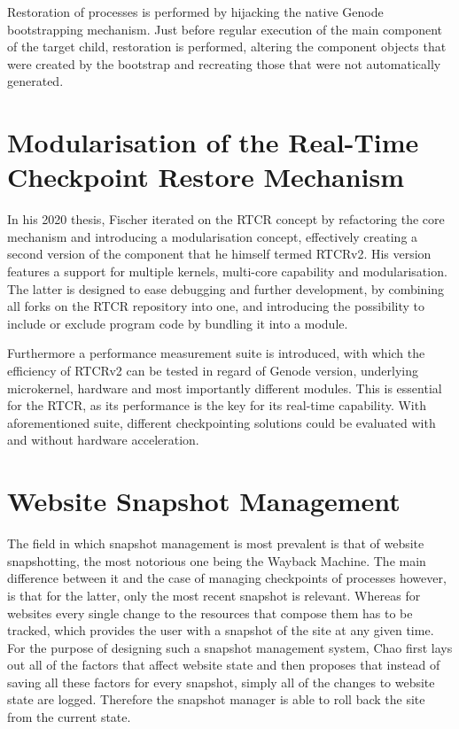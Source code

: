Restoration of processes is performed by hijacking the native Genode bootstrapping mechanism. Just before regular execution of the main component of the target child, restoration is performed, altering the component objects that were created by the bootstrap and recreating those that were not automatically generated. \cite{rtcr}

\section{Modularisation of the Real-Time Checkpoint Restore Mechanism}
In his 2020 thesis, Fischer iterated on the RTCR concept by refactoring the core mechanism and introducing a modularisation concept, effectively creating a second version of the component that he himself termed RTCRv2. His version features a support for multiple kernels, multi-core capability and modularisation. The latter is designed to ease debugging and further development, by combining all forks on the RTCR repository into one, and introducing the possibility to include or exclude program code by bundling it into a module. 

Furthermore a performance measurement suite is introduced, with which the efficiency of RTCRv2 can be tested in regard of Genode version, underlying microkernel, hardware and most importantly different modules. This is essential for the RTCR, as its performance is the key for its real-time capability. With aforementioned suite, different checkpointing solutions could be evaluated with and without hardware acceleration. \cite{rtcr2}

\section{Website Snapshot Management}
The field in which snapshot management is most prevalent is that of website snapshotting, the most notorious one being the Wayback Machine. The main difference between it and the case of managing checkpoints of processes however, is that for the latter, only the most recent snapshot is relevant. Whereas for websites every single change to the resources that compose them has to be tracked, which provides the user with a snapshot of the site at any given time. For the purpose of designing such a snapshot management system, Chao first lays out all of the factors that affect website state and then proposes that instead of saving all these factors for every snapshot, simply all of the changes to website state are logged. Therefore the snapshot manager is able to roll back the site from the current state. \cite{website}